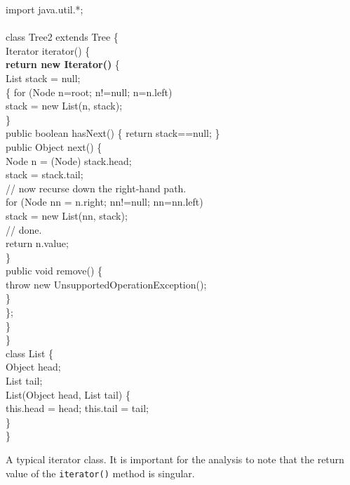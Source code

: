 \documentclass[11pt,notitlepage]{article}
\begin{document}
\begin{myfigure}\small
\begin{samplecode}
import java.util.*;\\
\\
class Tree2 extends Tree \{\\
\>Iterator iterator() \{\\
\>\>\textbf{return new Iterator()} \{\\
\>\>\>List stack = null;\\
\>\>\>\{ for (Node n=root; n!=null; n=n.left)\\
\>\>\>\>stack = new List(n, stack);\\
\>\>\>\}\\
\>\>\>public boolean hasNext() \{ return stack==null; \}\\
\>\>\>public Object next() \{\\
\>\>\>\>Node n = (Node) stack.head;\\
\>\>\>\>stack = stack.tail;\\
\>\>\>\>// now recurse down the right-hand path.\\
\>\>\>\>for (Node nn = n.right; nn!=null; nn=nn.left)\\
\>\>\>\>\>stack = new List(nn, stack);\\
\>\>\>\>// done.\\
\>\>\>\>return n.value;\\
\>\>\>\}\\
\>\>\>public void remove() \{\\
\>\>\>\>throw new UnsupportedOperationException();\\
\>\>\>\}\\
\>\>\};\\
\>\}\\
\}\\
class List \{\\
\>Object head;\\
\>List tail;\\
\>List(Object head, List tail) \{\\
\>\>this.head = head; this.tail = tail;\\
\>\}\\
\}\\
\end{samplecode}
\caption{A typical iterator class.  It is important for the analysis
  to note that the return value of the \texttt{iterator()} method is
  singular.}
\label{fig:iterator}
\end{myfigure}
\end{document}

